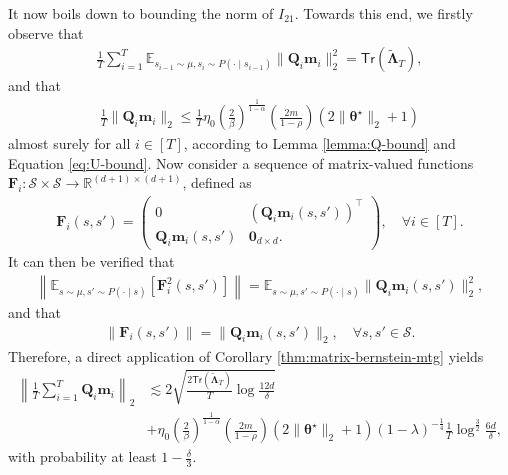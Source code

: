 It now boils down to bounding the norm of $I_{21}$. Towards this end, we firstly observe that
\begin{align*}
\frac{1}{T}\sum_{i=1}^T \mathbb{E}_{s_{i-1}\sim\mu,s_i \sim P(\cdot \mid s_{i-1})}\|\bm{Q}_i\bm{m}_i\|_2^2 = \mathsf{Tr}(\tilde{\bm{\Lambda}}_T),
\end{align*}
and that 
\begin{align*}
\frac{1}{T}\|\bm{Q}_i\bm{m}_i\|_2 \leq \frac{1}{T} \eta_0 \left(\frac{2}{\beta}\right)^{\frac{1}{1-\alpha}}\left(\frac{2m}{1-\rho}\right)(2\|\bm{\theta}^\star\|_2+1)
\end{align*}
almost surely for all $i \in [T]$, according to Lemma \ref{lemma:Q-bound} and Equation \eqref{eq:U-bound}. Now consider a sequence of matrix-valued functions $\bm{F}_i:\mathcal{S} \times \mathcal{S} \to \mathbb{R}^{(d+1) \times (d+1)}$, defined as
\begin{align*}
\bm{F}_i(s,s') = \begin{pmatrix}
0 & (\bm{Q}_i\bm{m}_i(s,s'))^\top \\ 
\bm{Q}_i\bm{m}_i(s,s') & \bm{0}_{d\times d}.
\end{pmatrix}, \quad \forall i \in [T].
\end{align*}
It can then be verified that 
\begin{align*}
\left\|\mathbb{E}_{s\sim \mu, s' \sim P(\cdot \mid s)}[\bm{F}_i^2(s,s')] \right\|= \mathbb{E}_{s\sim \mu, s' \sim P(\cdot \mid s)}\|\bm{Q}_i\bm{m}_i(s,s')\|_2^2,
\end{align*}
and that
\begin{align*}
\|\bm{F}_i(s,s')\| = \|\bm{Q}_i\bm{m}_i(s,s')\|_2, \quad \forall s,s' \in \mathcal{S}.
\end{align*}
Therefore, a direct application of Corollary \ref{thm:matrix-bernstein-mtg} yields
\begin{align}\label{eq:markov-bar-deltat-I21-bound}
\left\|\frac{1}{T}\sum_{i=1}^T \bm{Q}_i \bm{m}_i\right\|_2 &\lesssim 2\sqrt{\frac{2\mathsf{Tr}(\tilde{\bm{\Lambda}}_T)}{T}\log \frac{12d}{\delta}} \nonumber \\ 
&+ \eta_0 \left(\frac{2}{\beta}\right)^{\frac{1}{1-\alpha}}\left(\frac{2m}{1-\rho}\right)(2\|\bm{\theta}^\star\|_2+1)(1-\lambda)^{-\frac{1}{4}} \frac{1}{T}\log^{\frac{3}{2}}\frac{6d}{\delta},
\end{align}
with probability at least $1-\frac{\delta}{3}$.


